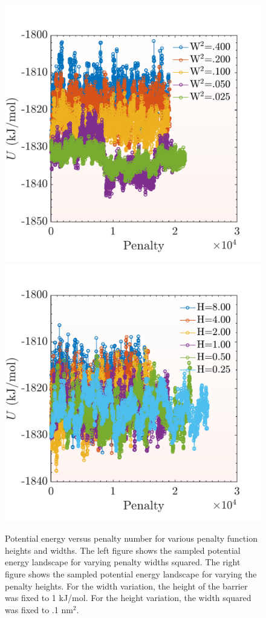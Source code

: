 \begin{figure}[h]
	\centering
	\includegraphics[width = .45\textwidth]{./Figures/MTD/width_dependence.pdf}
	\hspace{.01\textwidth}
	\includegraphics[width = .45\textwidth]{./Figures/MTD/height_dependence.pdf}
	\caption{Potential energy versus penalty number for various penalty function heights and widths.  The left figure shows the sampled potential energy landscape for varying penalty widths squared.  The right figure shows the sampled potential energy landscape for varying the penalty heights. For the width variation, the height of the barrier was fixed to 1 kJ/mol.  For the height variation, the width squared was fixed to .1 nm$^2$.}
	\label{coarsening}
\end{figure}

